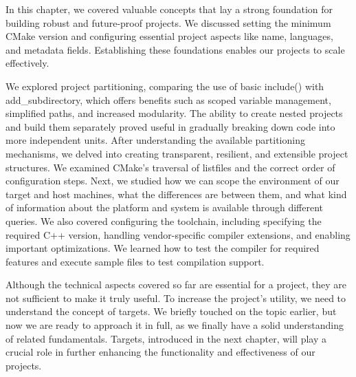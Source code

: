 In this chapter, we covered valuable concepts that lay a strong foundation for building robust and future-proof projects. We discussed setting the minimum CMake version and configuring essential project aspects like name, languages, and metadata fields. Establishing these foundations enables our projects to scale effectively.

We explored project partitioning, comparing the use of basic include() with add\_subdirectory, which offers benefits such as scoped variable management, simplified paths, and increased modularity. The ability to create nested projects and build them separately proved useful in gradually breaking down code into more independent units. After understanding the available partitioning mechanisms, we delved into creating transparent, resilient, and extensible project structures. We examined CMake’s traversal of listfiles and the correct order of configuration steps. Next, we studied how we can scope the environment of our target and host machines, what the differences are between them, and what kind of information about the platform and system is available through different queries. We also covered configuring the toolchain, including specifying the required C++ version, handling vendor-specific compiler extensions, and enabling important optimizations. We learned how to test the compiler for required features and execute sample files to test compilation support.

Although the technical aspects covered so far are essential for a project, they are not sufficient to make it truly useful. To increase the project’s utility, we need to understand the concept of targets.
We briefly touched on the topic earlier, but now we are ready to approach it in full, as we finally have a solid understanding of related fundamentals. Targets, introduced in the next chapter, will play a crucial role in further enhancing the functionality and effectiveness of our projects.